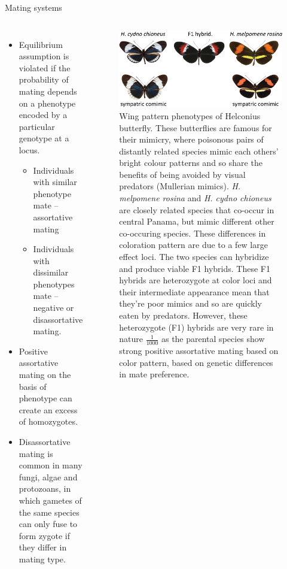 \documentclass[11pt,ignorenonframetext,aspectratio=169]{beamer}
\providecommand{\tightlist}{%
  \setlength{\itemsep}{0pt}\setlength{\parskip}{0pt}}
\newcommand{\bcolumns}{\begin{columns}[T, onlytextwidth]}
\newcommand{\ecolumns}{\end{columns}}
\begin{document}
\begin{frame}{Mating systems}
\protect\hypertarget{mating-systems}{}
\bcolumns
{}

\small

\begin{itemize}
\tightlist
\item
  Equilibrium assumption is violated if the probability of mating
  depends on a phenotype encoded by a particular genotype at a locus.

  \begin{itemize}
  \footnotesize
  \item Individuals with similar phenotype mate -- assortative mating
  \item Individuals with dissimilar phenotypes mate -- negative or disassortative mating.
  \end{itemize}
\item
  Positive assortative mating on the basis of phenotype can create an
  excess of homozygotes.
\item
  Disassortative mating is common in many fungi, algae and protozoans,
  in which gametes of the same species can only fuse to form zygote if
  they differ in mating type.
\end{itemize}


\begin{figure}
\includegraphics[width=0.72\linewidth]{./images/assortative_mating} \caption{Wing pattern phenotypes of Helconius butterfly. These butterflies are famous for their mimicry, where poisonous pairs of distantly related species mimic each others' bright colour patterns and so share the benefits of being avoided by visual predators (Mullerian mimics). \textit{H. melpomene rosina} and \textit{H. cydno chioneus} are closely related species that co-occur in central Panama, but mimic different other co-occuring species. These differences in coloration pattern are due to a few large effect loci. The two species can hybridize and produce viable F1 hybrids. These F1 hybrids are heterozygote at color loci and their intermediate appearance mean that they're poor mimics and so are quickly eaten by predators. However, these heterozygote (F1) hybrids are very rare in nature $\frac{1}{1000}$ as the parental species show strong positive assortative mating based on color pattern, based on genetic differences in mate preference.}\label{fig:assortative-mating}
\end{figure}

\ecolumns
\end{frame}
\end{document}
